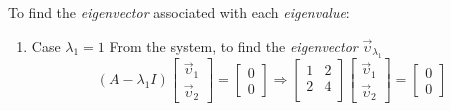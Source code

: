 \begin{remark}
    To find the \textit{eigenvector} associated with each \textit{eigenvalue}:
    
    \begin{enumerate}
        \item Case $\lambda_1 = 1$
            \subitem From the system, to find the \textit{eigenvector} ${\overrightarrow{\upsilon}}_{\lambda_1}$
            \begin{equation}
                (A - \lambda_1 I)
                \begin{bmatrix}
                    {\overrightarrow{\upsilon}}_{1} \\
                    {\overrightarrow{\upsilon}}_{2}
                \end{bmatrix}
                =
                \begin{bmatrix}
                    0 \\
                    0
                \end{bmatrix}
                \Rightarrow 
                \begin{bmatrix}
                    1 & 2 \\
                    2 & 4 \\
                \end{bmatrix}
                \begin{bmatrix}
                    {\overrightarrow{\upsilon}}_{1} \\
                    {\overrightarrow{\upsilon}}_{2}
                \end{bmatrix}
                =
                \begin{bmatrix}
                    0 \\
                    0
                \end{bmatrix}
            \end{equation}
            

\end{enumerate}
\end{remark}
